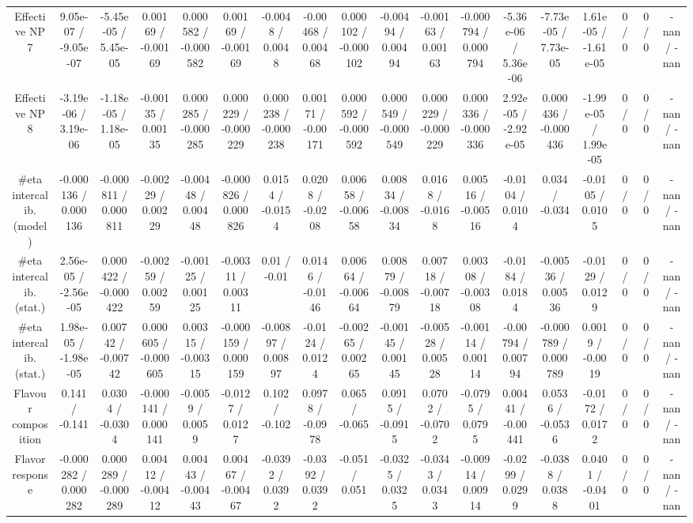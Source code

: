 \documentclass[10pt]{article}
\begin{document}
\begin{table}[htbp]
\begin{center}
\begin{tabular}{|c|c|c|c|c|c|c|c|c|c|c|c|c|c|c|c|c|c|}
  Effective NP 7 & 9.05e-07 / -9.05e-07 & -5.45e-05 / 5.45e-05 & 0.00169 / -0.00169 & 0.000582 / -0.000582 & 0.00169 / -0.00169 & -0.0048 / 0.0048 & -0.00468 / 0.00468 & 0.000102 / -0.000102 & -0.00494 / 0.00494 & -0.00163 / 0.00163 & -0.000794 / 0.000794 & -5.36e-06 / 5.36e-06 & -7.73e-05 / 7.73e-05 & 1.61e-05 / -1.61e-05 & 0 / 0 & 0 / 0 & -nan / -nan \\ 
  Effective NP 8 & -3.19e-06 / 3.19e-06 & -1.18e-05 / 1.18e-05 & -0.00135 / 0.00135 & 0.000285 / -0.000285 & 0.000229 / -0.000229 & 0.000238 / -0.000238 & 0.00171 / -0.00171 & 0.000592 / -0.000592 & 0.000549 / -0.000549 & 0.000229 / -0.000229 & 0.000336 / -0.000336 & 2.92e-05 / -2.92e-05 & 0.000436 / -0.000436 & -1.99e-05 / 1.99e-05 & 0 / 0 & 0 / 0 & -nan / -nan \\ 
  #eta intercalib. (model) & -0.000136 / 0.000136 & -0.000811 / 0.000811 & -0.00229 / 0.00229 & -0.00448 / 0.00448 & -0.000826 / 0.000826 & 0.0154 / -0.0154 & 0.0208 / -0.0208 & 0.00658 / -0.00658 & 0.00834 / -0.00834 & 0.0168 / -0.0168 & 0.00516 / -0.00516 & -0.0104 / 0.0104 & 0.034 / -0.034 & -0.0105 / 0.0105 & 0 / 0 & 0 / 0 & -nan / -nan \\ 
  #eta intercalib. (stat.) & 2.56e-05 / -2.56e-05 & 0.000422 / -0.000422 & -0.00259 / 0.00259 & -0.00125 / 0.00125 & -0.00311 / 0.00311 & 0.01 / -0.01 & 0.0146 / -0.0146 & 0.00664 / -0.00664 & 0.00879 / -0.00879 & 0.00718 / -0.00718 & 0.00308 / -0.00308 & -0.0184 / 0.0184 & -0.00536 / 0.00536 & -0.0129 / 0.0129 & 0 / 0 & 0 / 0 & -nan / -nan \\ 
  #eta intercalib. (stat.) & 1.98e-05 / -1.98e-05 & 0.00742 / -0.00742 & 0.000605 / -0.000605 & 0.00315 / -0.00315 & -0.000159 / 0.000159 & -0.00897 / 0.00897 & -0.0124 / 0.0124 & -0.00265 / 0.00265 & -0.00145 / 0.00145 & -0.00528 / 0.00528 & -0.00114 / 0.00114 & -0.00794 / 0.00794 & -0.000789 / 0.000789 & 0.0019 / -0.0019 & 0 / 0 & 0 / 0 & -nan / -nan \\ 
  Flavour composition & 0.141 / -0.141 & 0.0304 / -0.0304 & -0.000141 / 0.000141 & -0.0059 / 0.0059 & -0.0127 / 0.0127 & 0.102 / -0.102 & 0.0978 / -0.0978 & 0.065 / -0.065 & 0.0915 / -0.0915 & 0.0702 / -0.0702 & -0.0795 / 0.0795 & 0.00441 / -0.00441 & 0.0536 / -0.0536 & -0.0172 / 0.0172 & 0 / 0 & 0 / 0 & -nan / -nan \\ 
  Flavor response & -0.000282 / 0.000282 & 0.000289 / -0.000289 & 0.00412 / -0.00412 & 0.00443 / -0.00443 & 0.00467 / -0.00467 & -0.0392 / 0.0392 & -0.0392 / 0.0392 & -0.051 / 0.051 & -0.0325 / 0.0325 & -0.0343 / 0.0343 & -0.00914 / 0.00914 & -0.0299 / 0.0299 & -0.0388 / 0.0388 & 0.0401 / -0.0401 & 0 / 0 & 0 / 0 & -nan / -nan \\ 

\end{tabular}
\end{center}
\end{table}
\end{document}
